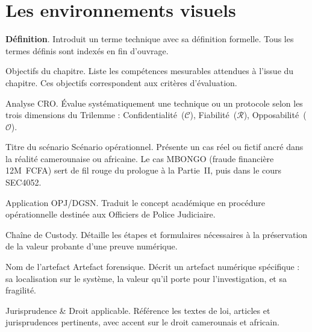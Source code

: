 \section*{Les environnements visuels}

\begin{boxdef}
\textbf{Définition}. Introduit un terme technique avec sa définition formelle.
Tous les termes définis sont indexés en fin d'ouvrage.
\end{boxdef}

\begin{boxobjectifs}
Objectifs du chapitre. Liste les compétences mesurables attendues à l'issue
du chapitre. Ces objectifs correspondent aux critères d'évaluation.
\end{boxobjectifs}

\begin{boxCRO}
Analyse CRO. Évalue systématiquement une technique ou un protocole selon
les trois dimensions du Trilemme : Confidentialité~($\mathcal{C}$),
Fiabilité~($\mathcal{R}$), Opposabilité~($\mathcal{O}$).
\end{boxCRO}

\begin{boxscenario}{Titre du scénario}
Scénario opérationnel. Présente un cas réel ou fictif ancré dans la réalité
camerounaise ou africaine. Le cas MBONGO (fraude financière 12M~FCFA) sert
de fil rouge du prologue à la Partie~II, puis dans le cours SEC4052.
\end{boxscenario}

\begin{boxPNC}
Application OPJ/DGSN. Traduit le concept académique en procédure opérationnelle
destinée aux Officiers de Police Judiciaire.
\end{boxPNC}

\begin{boxcustody}
Chaîne de Custody. Détaille les étapes et formulaires nécessaires à la
préservation de la valeur probante d'une preuve numérique.
\end{boxcustody}

\begin{boxartefact}{Nom de l'artefact}
Artefact forensique. Décrit un artefact numérique spécifique : sa localisation
sur le système, la valeur qu'il porte pour l'investigation, et sa fragilité.
\end{boxartefact}

\begin{boxjuris}
Jurisprudence \& Droit applicable. Référence les textes de loi, articles et
jurisprudences pertinents, avec accent sur le droit camerounais et africain.
\end{boxjuris}

